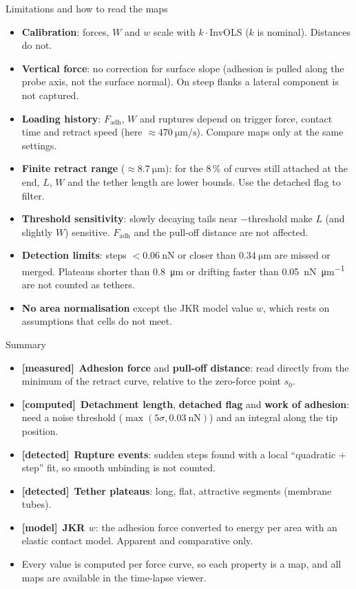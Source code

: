 \documentclass[aspectratio=169,9pt]{beamer}
\newcommand{\tagM}{\textcolor{cGreen}{\textbf{[measured]}}}
\newcommand{\tagC}{\textcolor{cOrange}{\textbf{[computed]}}}
\newcommand{\tagD}{\textcolor{cPurple}{\textbf{[detected]}}}
\newcommand{\tagMo}{\textcolor{cRed}{\textbf{[model]}}}
\begin{document}
\begin{frame}{Limitations and how to read the maps}
\small
\begin{itemize}
\item \textbf{Calibration}: forces, $W$ and $w$ scale with $k\cdot$InvOLS ($k$ is nominal). Distances do not.
\item \textbf{Vertical force}: no correction for surface slope (adhesion is pulled along the probe axis, not the surface normal). On steep flanks a lateral component is not captured.
\item \textbf{Loading history}: $F_\text{adh}$, $W$ and ruptures depend on trigger force, contact time and retract speed (here $\approx\SI{470}{\micro\metre\per\second}$). Compare maps only at the same settings.
\item \textbf{Finite retract range} ($\approx\SI{8.7}{\micro\metre}$): for the 8\,\% of curves still attached at the end, $L$, $W$ and the tether length are lower bounds. Use the detached flag to filter.
\item \textbf{Threshold sensitivity}: slowly decaying tails near $-$threshold make $L$ (and slightly $W$) sensitive. $F_\text{adh}$ and the pull-off distance are not affected.
\item \textbf{Detection limits}: steps $<\SI{0.06}{\nano\newton}$ or closer than $\SI{0.34}{\micro\metre}$ are missed or merged. Plateaus shorter than \SI{0.8}{\micro\metre} or drifting faster than \SI{0.05}{\nano\newton\per\micro\metre} are not counted as tethers.
\item \textbf{No area normalisation} except the JKR model value $w$, which rests on assumptions that cells do not meet.
\end{itemize}
\end{frame}

\begin{frame}{Summary}
\begin{itemize}
\item \tagM~\textbf{Adhesion force} and \textbf{pull-off distance}: read directly from the minimum of the retract curve, relative to the zero-force point $s_0$.
\item \tagC~\textbf{Detachment length}, \textbf{detached flag} and \textbf{work of adhesion}: need a noise threshold ($\max(5\sigma,\SI{0.03}{\nano\newton})$) and an integral along the tip position.
\item \tagD~\textbf{Rupture events}: sudden steps found with a local ``quadratic + step'' fit, so smooth unbinding is not counted.
\item \tagD~\textbf{Tether plateaus}: long, flat, attractive segments (membrane tubes).
\item \tagMo~\textbf{JKR $w$}: the adhesion force converted to energy per area with an elastic contact model. Apparent and comparative only.
\item Every value is computed per force curve, so each property is a map, and all maps are available in the time-lapse viewer.
\end{itemize}
\end{frame}
\end{document}
